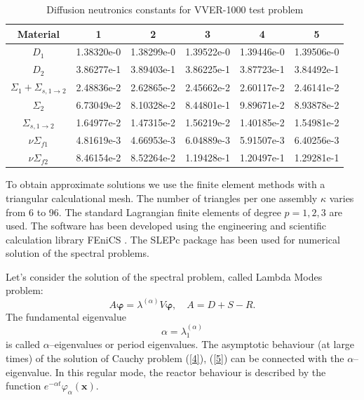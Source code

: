 \documentclass{llncs}
\begin{document}
\begin{table}[htp]
\caption{Diffusion neutronics constants for VVER-1000 test problem}
\label{t-1}
\begin{center}
\begin{tabular}{|c|c|c|c|c|c|}
\hline
Material & 1 & 2 & 3 & 4 & 5\\
\hline
$D_1$ & 1.38320e-0 & 1.38299e-0  & 1.39522e-0  & 1.39446e-0  & 1.39506e-0 \\
$D_2$ & 3.86277e-1 & 3.89403e-1 & 3.86225e-1 & 3.87723e-1 & 3.84492e-1 \\
$\Sigma_1 + \Sigma_{s,1\rightarrow 2}$ & 2.48836e-2 & 2.62865e-2 & 2.45662e-2 & 2.60117e-2 & 2.46141e-2\\
$\Sigma_2$ & 6.73049e-2 & 8.10328e-2 & 8.44801e-1 & 9.89671e-2 & 8.93878e-2\\
$\Sigma_{s,1\rightarrow 2}$ & 1.64977e-2 & 1.47315e-2 & 1.56219e-2 & 1.40185e-2 & 1.54981e-2\\
$\nu\Sigma_{f1}$ & 4.81619e-3 & 4.66953e-3 & 6.04889e-3 & 5.91507e-3 & 6.40256e-3\\
$\nu\Sigma_{f2}$ & 8.46154e-2 & 8.52264e-2 & 1.19428e-1 & 1.20497e-1 & 1.29281e-1\\
\hline
\end{tabular}
\end{center}
\end{table}

To obtain approximate solutions we use the finite element methods \cite{brenner} 
with a triangular calculational mesh. The number of triangles per one assembly $\kappa$  varies from 6 to 96. The standard Lagrangian finite elements of degree $p=1,2,3$ are used. 
The software has been developed using the engineering and scientific calculation library FEniCS \cite{fenics}. The SLEPc package \cite{slepc} has been used for numerical solution of the spectral problems.
 
Let's consider the solution of the spectral problem, called Lambda Modes problem:
\begin{equation}\label{9}
 A \bm \varphi  =  \lambda^{(\alpha)} V \bm \varphi ,
 \quad A = D + S - R . 
\end{equation} 
The fundamental eigenvalue
\[ 
 \alpha = \lambda^{(\alpha)}_1
\]
is called $\alpha$--eigenvalues or period eigenvalues. The asymptotic behaviour (at large times) of the solution of Cauchy problem  (\ref{4}), (\ref{5}) can be connected with the $\alpha$--eigenvalue. In this regular mode, the reactor behaviour is described by the function $e^{-\alpha t} \varphi_{\alpha}(\bm{x})$. 
\end{document}
